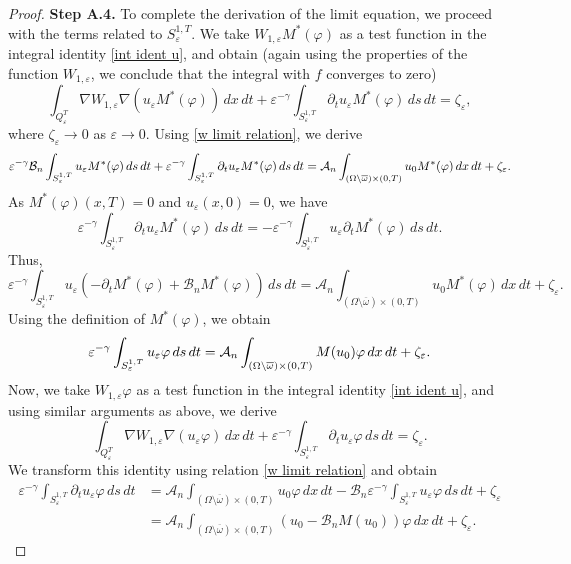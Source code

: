 \documentclass[10pt,a4paper]{amsart}
\numberwithin{equation}{section}
\begin{document}
\begin{proof}
\noindent\textbf{Step A.4.} 
To complete the derivation of the limit equation, we
proceed with the terms related to $S_{\varepsilon }^{1,T}$. We take $%
W_{1,\varepsilon }M^{\ast }(\varphi )$ as a test function in the integral
identity \eqref{int ident u}, and obtain (again using the properties of the
function $W_{1,\varepsilon }$, we conclude that the integral with $f$
converges to zero)
\[
\int _{Q_{\varepsilon }^{T}}\nabla W_{1,\varepsilon }\nabla
(u_{\varepsilon }M^{\ast }(\varphi ))\,dx\,dt+\varepsilon ^{-\gamma }\int
_{S_{\varepsilon }^{1,T}}\partial _{t}u_{\varepsilon }M^{\ast
}(\varphi )\,ds\,dt=\zeta _{\varepsilon },
\]
where $\zeta _{\varepsilon }\to 0$ as $\varepsilon \to 0$.
Using \eqref{w limit relation}, we derive
\[
\varepsilon ^{-\gamma }\mathcal{B}_n\int _{S_{\varepsilon
}^{1,T}}u_{\varepsilon }M^{\ast }(\varphi )\,ds\,dt+\varepsilon ^{-\gamma
}\int _{S_{\varepsilon }^{1,T}}\partial _{t}u_{\varepsilon }M^{\ast
}(\varphi )\,ds\,dt=\mathcal{A}_n\int _{(\Omega \setminus \overline{%
\omega })\times (0,T)}u_0M^{\ast }(\varphi )\,dx\,dt+\zeta _{\varepsilon }.
\]%
As $M^{\ast }(\varphi )(x,T)=0$ and $u_{\varepsilon }(x,0)=0$, we have
\[
\varepsilon ^{-\gamma }\int _{S_{\varepsilon }^{1,T}}\partial
_{t}u_{\varepsilon }M^{\ast }(\varphi )\,ds\,dt=-\varepsilon ^{-\gamma }\int
_{S_{\varepsilon }^{1,T}}u_{\varepsilon }\partial _{t}M^{\ast
}(\varphi )\,ds\,dt.
\]
Thus,
\[
\varepsilon ^{-\gamma }\int _{S_{\varepsilon }^{1,T}}u_{\varepsilon
}(-\partial _{t}M^{\ast }(\varphi )+\mathcal{B}_nM^{\ast }(\varphi ))\,ds\,dt%
=\mathcal{A}_n\int _{(\Omega \setminus \overline{\omega })\times
(0,T)}u_0M^{\ast }(\varphi )\,dx\,dt+\zeta _{\varepsilon }.
\]%
Using the definition of $M^{\ast }(\varphi )$, we obtain
\begin{equation}  \label{u conv uncont}
\varepsilon ^{-\gamma }\int _{S_{\varepsilon }^{1,T}}u_{\varepsilon
}\varphi \,ds\,dt=\mathcal{A}_n\int _{(\Omega \setminus \overline{%
\omega })\times (0,T)}M(u_0)\varphi \,dx\,dt+\zeta _{\varepsilon }.
\end{equation}
Now, we take $W_{1,\varepsilon }\varphi $ as a test function in the integral
identity \eqref{int ident u}, and using similar arguments as above, we
derive
\[
\int _{Q_{\varepsilon }^{T}}\nabla W_{1,\varepsilon }\nabla
(u_{\varepsilon }\varphi )\,dx\,dt+\varepsilon ^{-\gamma }\int
_{S_{\varepsilon }^{1,T}}\partial _{t}u_{\varepsilon }\varphi \,ds\,dt%
=\zeta _{\varepsilon }.
\]
We transform this identity using relation \eqref{w limit relation} and
obtain
\begin{equation}
\begin{aligned}
\varepsilon ^{-\gamma }\int _{S_{\varepsilon }^{1,T}}\partial
_{t}u_{\varepsilon }\varphi \,ds\,dt
&=\mathcal{A}_n\int _{(\Omega
\setminus \overline{\omega })\times (0,T)}u_0\varphi \,dx\,dt-\mathcal{B}%
_n\varepsilon ^{-\gamma }\int _{S_{\varepsilon
}^{1,T}}u_{\varepsilon }\varphi \,ds\,dt+\zeta _{\varepsilon }    \\
&=\mathcal{A}_n\int _{(\Omega \setminus \overline{\omega })\times
(0,T)}(u_0-\mathcal{B}_nM(u_0))\varphi \,dx\,dt+\zeta _{\varepsilon }.
\end{aligned} \label{pa_t u conv uncontrol}
\end{equation}


\end{proof}
\end{document}
